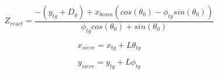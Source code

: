 \begin{equation} \label{eq:zreact}
	Z_{react} = \frac{-\left( y_{tg} + D_y \right) + x_{beam}\left( cos\left( \theta_0 \right) - \phi_{tg} sin\left( \theta_0 \right) \right)}{\phi_{tg} cos\left( \theta_0 \right) + sin\left( \theta_0 \right)}
\end{equation}

\begin{equation} \label{eq:xsieve}
	x_{sieve} = x_{tg} + L \theta_{tg}
\end{equation}

\begin{equation} \label{eq:ysieve}
	y_{sieve} = y_{tg} + L \phi_{tg}
\end{equation}